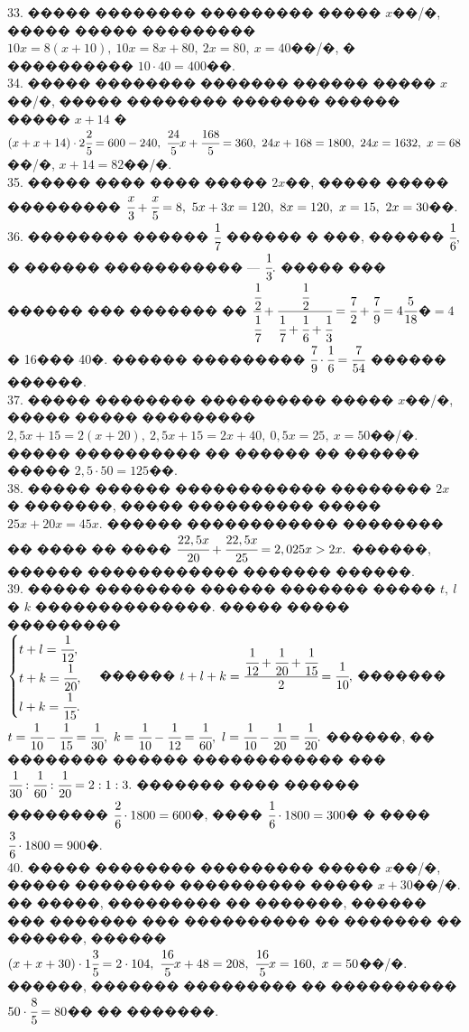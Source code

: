 \documentclass[12pt]{article}
\begin{document}
33. ����� �������� ��������� ����� $x$��/�, ����� ����� ��������� $10x=8(x+10),\ 10x=8x+80,\ 2x=80,\ x=40$��/�, � ���������� $10\cdot40=400$��.\\
34. ����� �������� ������� ������ ����� $x$��/�, ����� �������� ������� ������ ����� $x+14$ � $(x+x+14)\cdot2\cfrac{2}{5}=600-240,\ \cfrac{24}{5}x+\cfrac{168}{5}=360,\ 24x+168=1800,\ 24x=1632,\ x=68$��/�, $x+14=82$��/�.\\
35. ����� ���� ���� ����� $2x$��, ����� ����� ��������� $\cfrac{x}{3}+\cfrac{x}{5}=8,\ 5x+3x=120,\ 8x=120,\ x=15,\ 2x=30$��.\\
36. �������� ������ $\cfrac{1}{7}$ ������ � ���, ������ $\cfrac{1}{6},$ � ������ ����������� --- $\cfrac{1}{3}.$ ����� ��� ������ ��� ������� �� $\cfrac{\cfrac{1}{2}}{\cfrac{1}{7}}+\cfrac{\cfrac{1}{2}}{\cfrac{1}{7}+\cfrac{1}{6}+\cfrac{1}{3}}=\cfrac{7}{2}+\cfrac{7}{9}=4\cfrac{5}{18}$�$=4$� 16��� 40�. ������ ��������� $\cfrac{7}{9}\cdot\cfrac{1}{6}=\cfrac{7}{54}$ ������ ������.\\
37. ����� �������� ���������� ����� $x$��/�, ����� ����� ��������� $2,5x+15=2(x+20),\ 2,5x+15=2x+40,\ 0,5x=25,\ x=50$��/�. ����� ���������� �� ������ �� ������ ����� $2,5\cdot50=125$��.\\
38. ����� ������ ������������ �������� $2x$� �������, ����� ���������� ����� $25x+20x=45x.$ ������ ������������ �������� �� ���� �� ���� $\cfrac{22,5x}{20}+
\cfrac{22,5x}{25}=2,025x>2x.$ ������, ������ ������������ ������� ������.\\
39. ����� �������� ������ ������� ����� $t,\ l$ � $k$ ��������������. ����� ����� ���������\\ $\begin{cases}t+l=\cfrac{1}{12},\\ t+k=\cfrac{1}{20},\\ l+k=\cfrac{1}{15}.\end{cases}$ ������ $t+l+k=\cfrac{\cfrac{1}{12}+\cfrac{1}{20}+\cfrac{1}{15}}{2}=\cfrac{1}{10},$ ������� $t=\cfrac{1}{10}-\cfrac{1}{15}=\cfrac{1}{30},\ k=\cfrac{1}{10}-\cfrac{1}{12}=\cfrac{1}{60},\ l=\cfrac{1}{10}-\cfrac{1}{20}=\cfrac{1}{20}.$ ������, �� �������� ������ ������������ ��� $\cfrac{1}{30}:\cfrac{1}{60}:\cfrac{1}{20}=2:1:3.$ ������� ���� ������ �������� $\cfrac{2}{6}\cdot1800=600$�, ���� $\cfrac{1}{6}\cdot1800=300$� � ���� $\cfrac{3}{6}\cdot1800=900$�.\\
40. ����� �������� ��������� ����� $x$��/�, ����� �������� ���������� ����� $x+30$��/�. �� �����, ��������� �� �������, ������ ��� ������� ��� ���������� �� ������� �� ������, ������ $(x+x+30)\cdot1\cfrac{3}{5}=2\cdot104,\ \cfrac{16}{5}x+48=208,\ \cfrac{16}{5}x=160,\ x=50$��/�. ������, ������� ��������� �� ���������� $50\cdot\cfrac{8}{5}=80$�� �� �������. \\
\end{document}
